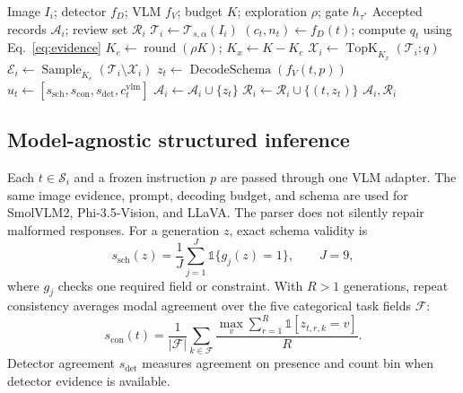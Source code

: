 \begin{algorithm}[t]
\caption{Budgeted routing and selective VLM inference}
\label{alg:ornascout}
\begin{algorithmic}[1]
\Require Image $I_i$; detector $f_D$; VLM $f_V$; budget $K$; exploration $\rho$; gate $h_{\tau^*}$
\Ensure Accepted records $\mathcal{A}_i$; review set $\mathcal{R}_i$
\State $\mathcal{T}_i\gets\mathcal{T}_{s,\alpha}(I_i)$
  \State $(c_t,n_t)\gets f_D(t)$; compute $q_t$ using Eq.~\eqref{eq:evidence}
\EndFor
\State $K_e\gets\operatorname{round}(\rho K)$; $K_x\gets K-K_e$
\State $\mathcal{X}_i\gets\operatorname{TopK}_{K_x}(\mathcal{T}_i;q)$
\State $\mathcal{E}_i\gets\operatorname{Sample}_{K_e}(\mathcal{T}_i\setminus\mathcal{X}_i)$
  \State $z_t\gets\operatorname{DecodeSchema}(f_V(t,p))$
  \State $u_t\gets[s_{\mathrm{sch}},s_{\mathrm{con}},s_{\mathrm{det}},c_t^{\mathrm{vlm}}]$
    \State $\mathcal{A}_i\gets\mathcal{A}_i\cup\{z_t\}$
  \Else
    \State $\mathcal{R}_i\gets\mathcal{R}_i\cup\{(t,z_t)\}$
  \EndIf
\EndFor
\State \Return $\mathcal{A}_i,\mathcal{R}_i$
\end{algorithmic}
\end{algorithm}

\subsection{Model-agnostic structured inference}
Each $t\in\mathcal{S}_i$ and a frozen instruction $p$ are passed through one VLM adapter. The same image evidence, prompt, decoding budget, and schema are used for SmolVLM2, Phi-3.5-Vision, and LLaVA. The parser does not silently repair malformed responses. For a generation $z$, exact schema validity is
\begin{equation}
s_{\mathrm{sch}}(z)=\frac{1}{J}\sum_{j=1}^{J}\mathbb{1}\{g_j(z)=1\},\qquad J=9,
\label{eq:schema}
\end{equation}
where $g_j$ checks one required field or constraint. With $R>1$ generations, repeat consistency averages modal agreement over the five categorical task fields $\mathcal{F}$:
\begin{equation}
s_{\mathrm{con}}(t)=\frac{1}{|\mathcal{F}|}\sum_{k\in\mathcal{F}}
\frac{\max_v\sum_{r=1}^{R}\mathbb{1}[z_{t,r,k}=v]}{R}.
\label{eq:consistency}
\end{equation}
Detector agreement $s_{\mathrm{det}}$ measures agreement on presence and count bin when detector evidence is available.

